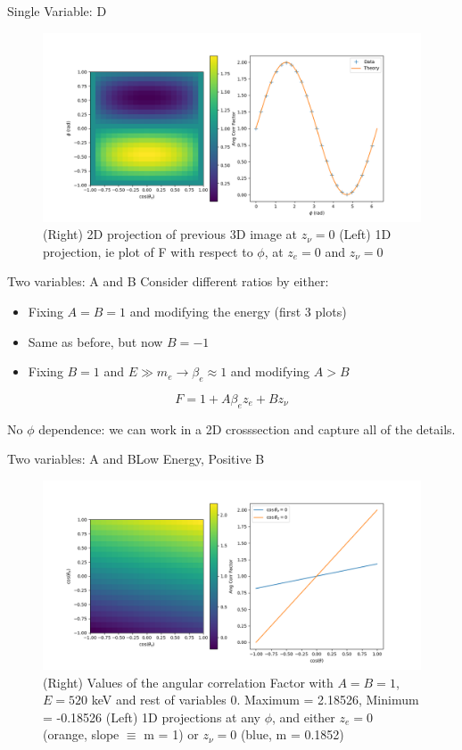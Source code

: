 \documentclass{beamer}
\begin{document}
\begin{frame}{Single Variable: D}
	\begin{figure}
		\centering
		\includegraphics[width=0.8\paperwidth]{plots/crosssections_D.png}
		\caption{(Right) 2D projection of previous 3D image at $z_\nu = 0$ (Left) 1D projection, ie plot of F with respect to $\phi$, at $z_e = 0$ and $z_\nu = 0$ }
	\end{figure}
\end{frame}
\begin{frame}{Two variables: A and B}
	Consider different ratios by either:
	\begin{itemize}
		\item Fixing $A = B = 1$ and modifying the energy (first 3 plots)
		\item Same as before, but now $B = -1$
		\item Fixing $B = 1$ and $E \gg m_e \rightarrow \beta_e \approx 1$ and modifying $A > B$
	\end{itemize}
		
	$$F = 1 + A\beta_ez_e + Bz_\nu$$
		
	No $\phi$ dependence: we can work in a 2D crosssection and capture all of the details.
	
\end{frame}
\begin{frame}{Two variables: A and B}{Low Energy, Positive B}
	\begin{figure}
		\centering
		\includegraphics[width=0.8\paperwidth]{plots/posA_posB_lowE.png}
		\caption{(Right) Values of the angular correlation Factor with $A = B = 1$, $E = 520$ keV and rest of variables 0. Maximum = 2.18526, Minimum = -0.18526 (Left) 1D projections at any $\phi$, and either $z_e = 0$ (orange, slope $\equiv$ m = 1) or $z_\nu = 0$ (blue, m = 0.1852)}	
	\end{figure}
\end{frame}
\end{document}
